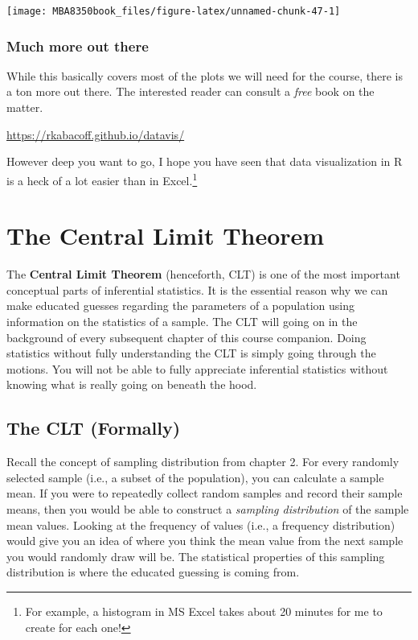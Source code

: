 \documentclass[
]{book}
\begin{document}
\begin{center}\texttt{[image: MBA8350book\_files/figure-latex/unnamed-chunk-47-1]} \end{center}

\hypertarget{much-more-out-there}{%
\subsection{Much more out there}\label{much-more-out-there}}

While this basically covers most of the plots we will need for the course, there is a ton more out there. The interested reader can consult a \emph{free} book on the matter.

\url{https://rkabacoff.github.io/datavis/}

However deep you want to go, I hope you have seen that data visualization in R is a heck of a lot easier than in Excel.\footnote{For example, a histogram in MS Excel takes about 20 minutes for me to create for each one!}

\hypertarget{CLT}{%
\chapter{The Central Limit Theorem}\label{CLT}}

The \textbf{Central Limit Theorem} (henceforth, CLT) is one of the most important conceptual parts of inferential statistics. It is the essential reason why we can make educated guesses regarding the parameters of a population using information on the statistics of a sample. The CLT will going on in the background of every subsequent chapter of this course companion. Doing statistics without fully understanding the CLT is simply going through the motions. You will not be able to fully appreciate inferential statistics without knowing what is really going on beneath the hood.

\hypertarget{the-clt-formally}{%
\section{The CLT (Formally)}\label{the-clt-formally}}

Recall the concept of sampling distribution from chapter 2. For every randomly selected sample (i.e., a subset of the population), you can calculate a sample mean. If you were to repeatedly collect random samples and record their sample means, then you would be able to construct a \emph{sampling distribution} of the sample mean values. Looking at the frequency of values (i.e., a frequency distribution) would give you an idea of where you think the mean value from the next sample you would randomly draw will be. The statistical properties of this sampling distribution is where the educated guessing is coming from.
\end{document}
